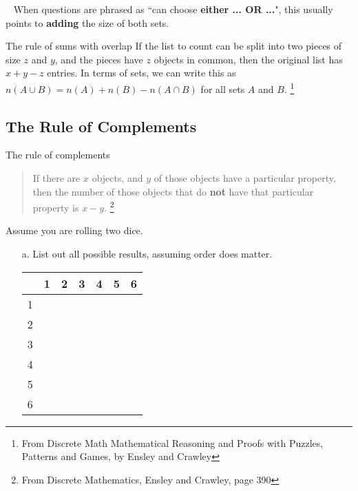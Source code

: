 {        \begin{hint}{\ }
            When questions are phrased as ``can choose \textbf{either ... OR ...}",
            this usually points to \textbf{adding} the size of both sets.
        \end{hint}

    \newpage
    
    \begin{intro}{The rule of sums with overlap}
        If the list to count can be split into two pieces of size $z$
        and $y$, and the pieces have $z$ objects in common, then the original
        list has $x + y - z$ entries. In terms of sets, we can write this as
        $n(A \cup B) = n(A) + n(B) - n(A \cap B)$ for all sets $A$ and $B$.
    \footnote{From Discrete Math Mathematical Reasoning and Proofs with Puzzles, Patterns and Games, by Ensley and Crawley}
    \end{intro}

    \subsection{The Rule of Complements}
    
    \begin{intro}{The rule of complements}
        \begin{quote}
        If there are $x$ objects, and $y$ of those objects have a particular property,
        then the number of those objects that do \textbf{not} have that particular
        property is $x - y$.
        \footnote{From Discrete Mathematics, Ensley and Crawley, page 390}
        \end{quote}
    \end{intro}
    
    \begin{questionNOGRADE}{\thequestion}
        Assume you are rolling two dice.

        \begin{enumerate}
            \item[a.]   List out all possible results, assuming order does matter.
            \begin{center}
                \Large 
                \begin{tabular}{ c | p{1cm} p{1cm} p{1cm} p{1cm} p{1cm} p{1cm} }
                    & 1 & 2 & 3 & 4 & 5 & 6
                    \\ \hline
                    1 \\ 2 \\ 3 \\ 4 \\ 5 \\ 6 
                \end{tabular}
            \end{center}


\end{enumerate}
\end{questionNOGRADE}}
